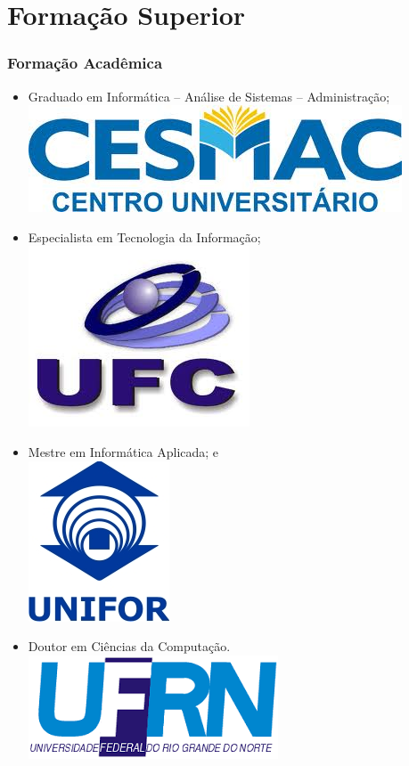 \documentclass{beamer}
\begin{document}
\section{Formação Superior}

\begin{frame}
	\frametitle{Formação Acadêmica}

	\begin{itemize}
		\item Graduado em Informática -- Análise de Sistemas -- Administração;\\
		\includegraphics[scale=0.1]{imagens/CESMAC-Logo}
		
		\item Especialista em Tecnologia da Informação;\\
		\includegraphics[scale=0.1]{imagens/UFC_Logo}
		
		\item Mestre em Informática Aplicada; e\\
		\includegraphics[scale=0.5]{imagens/UNIFOR-Logo}
		
		\item Doutor em Ciências da Computação.\\
		\includegraphics[scale=0.15]{imagens/ufrn-logo}
		

\end{itemize}
\end{frame}
\end{document}
